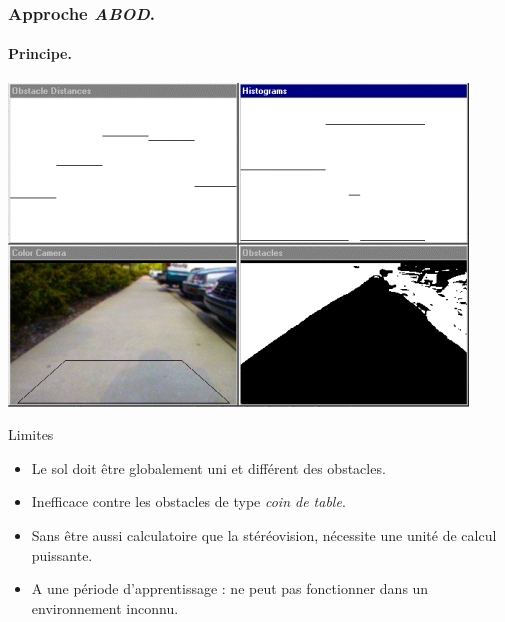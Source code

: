\begin{frame}
    \frametitle{Approche \emph{ABOD}.}
    \framesubtitle{Principe.}
     {
        \begin{center}
            \includegraphics[width=0.8\linewidth]{rcs/abod.png}
        \end{center}
    }
     {
        \begin{alertblock}{Limites}
            \begin{itemize}
                \pause \item Le sol doit être globalement uni et différent des obstacles.
                \pause \item Inefficace contre les obstacles de type \emph{coin de table}.
                \pause \item Sans être aussi calculatoire que la stéréovision, nécessite une unité de calcul puissante.
                \pause \item A une période d'apprentissage : ne peut pas fonctionner dans un environnement inconnu.
            \end{itemize}
        \end{alertblock}
    }
\end{frame}

